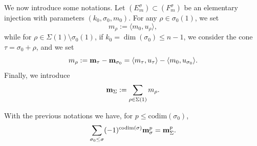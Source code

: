 \documentclass[a4paper,10pt]{amsart}
\theoremstyle{plain}{
    \newtheorem{theorem}{Theorem}[section]
    \newtheorem{lemma}[theorem]{Lemma}
    \newtheorem{corollary}[theorem]{Corollary}
    \newtheorem{proposition}[theorem]{Proposition}
    \newtheorem{conjecture}[theorem]{Conjecture}
}
\theoremstyle{definition}{
    \newtheorem{definition}[theorem]{Definition}
    \newtheorem{defn-thm}[theorem]{Definition-Theorem}
    \newtheorem{example}[theorem]{Example}
    \newtheorem{notation}[theorem]{Notation}
}
\theoremstyle{remark}{
    \newtheorem{remark}[theorem]{Remark}
    \newtheorem{problem}[theorem]{Problem}
    \newtheorem{question}[theorem]{Question}
}
\def\um{{\bf m}}
\def\codim{\mathrm{codim}}
\begin{document}
 
We now introduce some notations. Let $(E^\sigma_m)\subset(F^\sigma_m)$ be an elementary injection with parameters $(k_0,\sigma_0,m_0)$. For any $\rho\in\sigma_0(1)$, we set 
 $$
 m_\rho:=\langle m_0, u_\rho \rangle,
 $$
 while for $\rho\in\Sigma(1)\setminus \sigma_0(1)$, if $k_0=\dim(\sigma_0)\leq n-1$, we consider the cone $\tau=\sigma_0+\rho$, and we set
 \begin{equation}
  \label{eq:definition m rho}
 m_\rho:=\um_\tau-\um_{\sigma_0}=\langle m_\tau,u_\tau\rangle - \langle m_0,u_{\sigma_0}\rangle.
 \end{equation}
 Finally, we introduce
 \begin{equation}
  \label{eq:umbigsigma}
 \um_\Sigma:=\sum_{\rho\in\Sigma(1)} m_\rho.
 \end{equation}
 \begin{lemma}
  \label{lem:sum minus one on cones}
  With the previous notations we have, for $p\leq \codim(\sigma_0)$,
\begin{equation}
 \label{eq:summinusonemsigma}
\sum_{\sigma_0\leq\sigma} (-1)^{\codim(\sigma)}\um_\sigma^p=\um_\Sigma^p.
\end{equation}
 \end{lemma}
\end{document}
